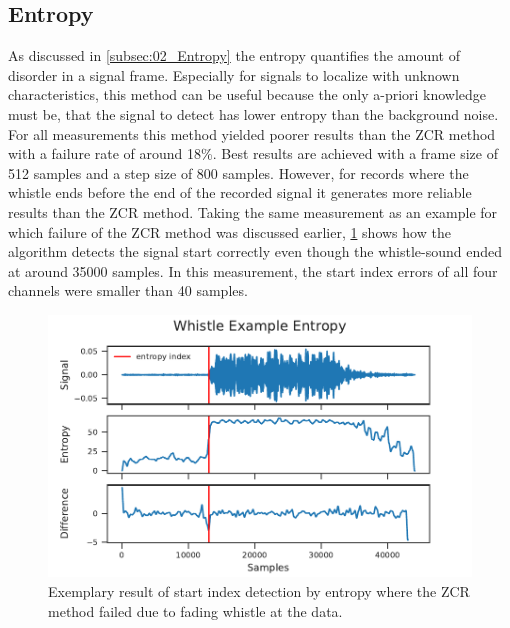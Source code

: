 \subsection{Entropy}
\label{subsec:04_entropy}

As discussed in \cref{subsec:02_Entropy} the entropy quantifies the amount
of disorder in a signal frame.
Especially for signals to localize with unknown characteristics,
this method can be useful because the only a-priori knowledge must be,
that the signal to detect has lower entropy than the background noise.
For all measurements this method yielded poorer results than the \ac{ZCR} method
with a failure rate of around 18\si{\percent}.
Best results are achieved with a frame size of 512 samples and a step size of 800
samples.
However, for records where the whistle ends before the end of the recorded signal
it generates more reliable results than the \ac{ZCR} method.
Taking the same measurement as an example for which failure of the \ac{ZCR} method
was discussed earlier, \cref{fig:04_entropyGood} shows how the algorithm
detects the signal start correctly even though the whistle-sound ended at
around 35000 samples. In this measurement, the start index errors of all four
channels were smaller than 40 samples.
\begin{figure}[ht]
	\centering
	\includegraphics[]{figures/evaluation/entropy_good}
	\caption{Exemplary result of start index detection by entropy where
		the \ac{ZCR} method failed due to fading whistle
		at the data.}
	\label{fig:04_entropyGood}
\end{figure}




